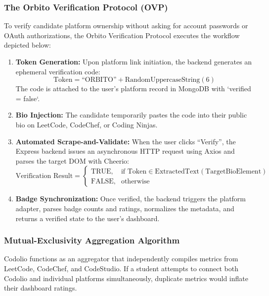 \documentclass[12pt,a4paper]{article}
\begin{document}
\subsubsection{The Orbito Verification Protocol (OVP)}
To verify candidate platform ownership without asking for account passwords or OAuth authorizations, the Orbito Verification Protocol executes the workflow depicted below:
\begin{enumerate}[leftmargin=*]
    \item \textbf{Token Generation:} Upon platform link initiation, the backend generates an ephemeral verification code:
    \begin{equation}
        \text{Token} = \text{``ORBITO''} + \text{RandomUppercaseString}(6)
    \end{equation}
    The code is attached to the user's platform record in MongoDB with `verified = false`.
    \item \textbf{Bio Injection:} The candidate temporarily pastes the code into their public bio on LeetCode, CodeChef, or Coding Ninjas.
    \item \textbf{Automated Scrape-and-Validate:} When the user clicks ``Verify'', the Express backend issues an asynchronous HTTP request using Axios and parses the target DOM with Cheerio:
    \begin{equation}
        \text{Verification Result} = 
        \begin{cases} 
            \text{TRUE}, & \text{if } \text{Token} \in \text{ExtractedText}(\text{TargetBioElement}) \\
            \text{FALSE}, & \text{otherwise}
        \end{cases}
    \end{equation}
    \item \textbf{Badge Synchronization:} Once verified, the backend triggers the platform adapter, parses badge counts and ratings, normalizes the metadata, and returns a verified state to the user's dashboard.
\end{enumerate}

\subsubsection{Mutual-Exclusivity Aggregation Algorithm}
Codolio functions as an aggregator that independently compiles metrics from LeetCode, CodeChef, and CodeStudio. If a student attempts to connect both Codolio and individual platforms simultaneously, duplicate metrics would inflate their dashboard ratings. 
\end{document}
